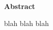 


\vspace*{4cm}

\begin{center}
  \begin{minipage}{.8\textwidth}
    \begin{center}
      \large
      \textbf{Abstract}
    \end{center}

    blah blah blah
  \end{minipage}
\end{center}

\clearpage
